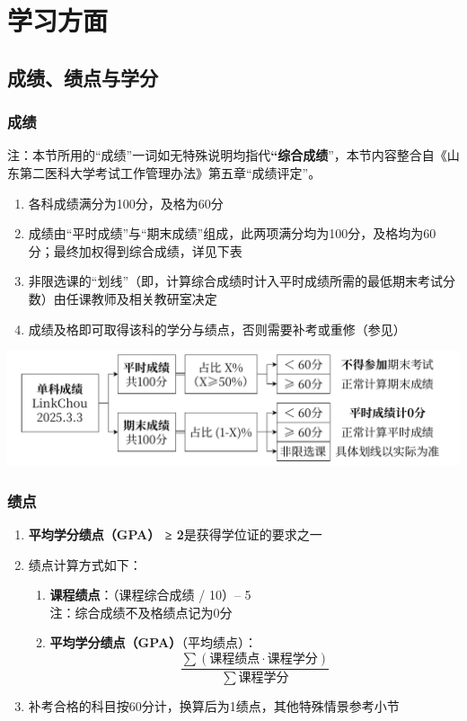 \chapter[学习方面]{学习方面}

\section[成绩、绩点与学分]{成绩、绩点与学分}

\subsection[成绩]{成绩}
注：本节所用的“成绩”一词如无特殊说明均指代\textbf{“综合成绩}”，本节内容整合自《山东第二医科大学考试工作管理办法》第五章“成绩评定”。
\begin{enumerate}
    \item 各科成绩满分为100分，及格为60分
    \item 成绩由“平时成绩”与“期末成绩”组成，此两项满分均为100分，及格均为60分；最终加权得到综合成绩，详见下表
    \item 非限选课的“划线”（即，计算综合成绩时计入平时成绩所需的最低期末考试分数）由任课教师及相关教研室决定
    \item 成绩及格即可取得该科的学分与绩点，否则需要补考或重修（参见）
\end{enumerate}

\begin{table}[H]
    \centering
    \includegraphics[width=\textwidth]{resources/sundry/单科成绩计算.pdf}
    \label{score}
\end{table}

\subsection[绩点]{绩点}
\label{gpa} %
\begin{enumerate}
    \item \textbf{平均学分绩点（GPA） ≥ 2}是获得学位证的要求之一
    \item 绩点计算方式如下：
          \begin{enumerate}
              \item \textbf{课程绩点}：（课程综合成绩 / 10）-- 5\\
                    注：综合成绩不及格绩点记为0分
              \item \textbf{平均学分绩点（GPA）}（平均绩点）：
                    $$\frac{\sum (课程绩点 \cdot 课程学分)}{\sum 课程学分}$$
          \end{enumerate}
    \item 补考合格的科目按60分计，换算后为1绩点，其他特殊情景参考小节
\end{enumerate}

